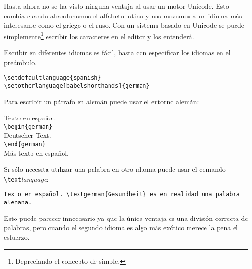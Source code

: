 Hasta ahora no se ha visto ninguna ventaja al usar un motor  
Unicode. Esto cambia cuando abandonamos el alfabeto latino y nos movemos a un 
idioma más interesante como el griego o el ruso. Con un sistema basado en 
Unicode se puede simplemente\footnote{Depreciando el concepto de simple.} 
escribir los caracteres en el editor y  los entenderá.

Escribir en diferentes idiomas es fácil, basta con especificar los idiomas en 
el preámbulo.

\begin{lscommand}
\verb|\setdefaultlanguage{spanish}|\\
\verb|\setotherlanguage[babelshorthands]{german}|
\end{lscommand}
%
Para escribir un párrafo en alemán puede usar el entorno alemán:

\begin{lscommand}
Texto en español.\\
\verb|\begin{german}|\\
Deutscher Text.\\
\verb|\end{german}|\\
Más texto en español.
\end{lscommand}

Si sólo necesita utilizar una palabra en otro idioma puede usar el comando
\verb|\text|\emph{language}:

\begin{lscommand}
\verb|Texto en español. \textgerman{Gesundheit} es en realidad una palabra alemana.|
\end{lscommand}

Esto puede parecer innecesario ya que la única ventaja es una división correcta 
de palabras, pero cuando el segundo idioma es algo más exótico merece la pena 
el esfuerzo.


